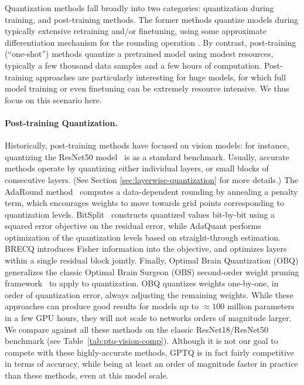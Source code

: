 Quantization methods fall broadly into two categories: quantization during training, and post-training methods. The former methods quantize models during typically extensive retraining and/or finetuning, using some approximate differentiation mechanism for the rounding operation \cite{gholami2021survey, nagel2021white}. By contrast, post-training (``one-shot'') methods quantize a pretrained model using modest resources, typically a few thousand data samples and a few hours of computation. Post-training approaches are particularly interesting for huge models, for which full model training or even finetuning can be extremely resource intensive. 
We thus focus on this scenario here. 

\paragraph{Post-training Quantization.} 
Historically, post-training methods have focused on vision models: for instance, quantizing the ResNet50 model~\cite{he2016deep} is as a standard benchmark. 
Usually, accurate methods operate by quantizing either individual layers, or small blocks of consecutive layers. (See Section \ref{sec:layerwise-quantization} for more details.) 
The AdaRound method~\cite{nagel2020up} computes a data-dependent rounding by annealing a penalty term, which encourages weights to move towards grid points corresponding to quantization levels. BitSplit~\cite{wang2020towards} constructs quantized values bit-by-bit using a squared error objective on the residual error, while AdaQuant \cite{hubara2021accurate} performs  optimization of the quantization levels based on straight-through estimation. 
BRECQ \cite{li2021brecq} introduces Fisher information into the objective, and optimizes layers within a single residual block jointly. 
Finally, Optimal Brain Quantization (OBQ) \cite{frantar2022obc} generalizes the classic Optimal Brain Surgeon (OBS) second-order weight pruning framework~\cite{hassibi1993optimal, singh2020woodfisher, frantar2021m} to apply to quantization.
OBQ quantizes weights one-by-one, in order of quantization error, always adjusting the remaining weights. 
While these approaches can produce good results for models up to $\approx100$ million parameters in a few GPU hours, they will not scale to networks orders of magnitude larger. 
We compare against all these methods on the classic ResNet18/ResNet50 benchmark (see Table~\ref{tab:ptq-vision-comp}). Although it is not our goal to compete with these highly-accurate methods, GPTQ is in fact fairly competitive in terms of accuracy, while being at least an order of magnitude faster in practice than these methods, even at this model scale. 
 
